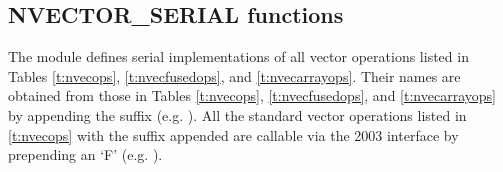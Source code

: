 \subsection{NVECTOR\_SERIAL functions}
\label{ss:nvec_ser_functions}

The {\nvecs} module defines serial implementations of all vector operations listed 
in Tables \ref{t:nvecops}, \ref{t:nvecfusedops}, and \ref{t:nvecarrayops}. Their
names are obtained from those in Tables \ref{t:nvecops}, \ref{t:nvecfusedops},
and \ref{t:nvecarrayops} by appending the suffix 
(e.g. ).
All the standard vector operations listed in \ref{t:nvecops} with the suffix
 appended are callable via the {\F} 2003 interface by prepending an
`F' (e.g. ).

